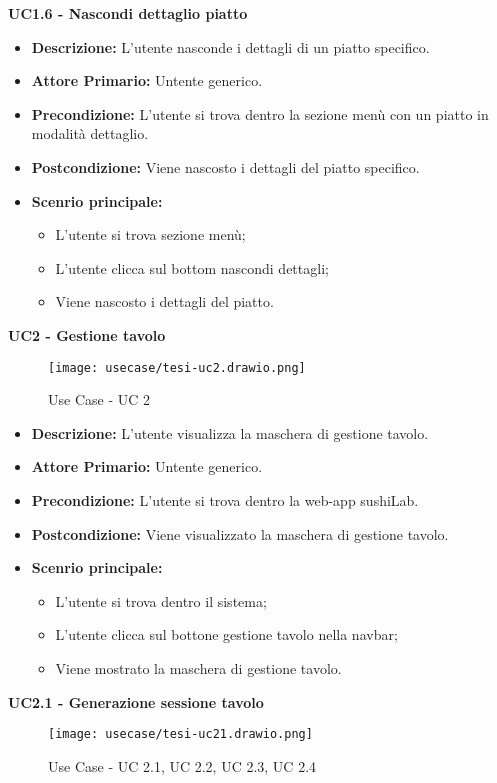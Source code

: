 \textbf{UC1.6 - Nascondi dettaglio piatto}
\begin{itemize}
    \item \textbf{Descrizione:} L'utente nasconde i dettagli di un piatto specifico.
    \item \textbf{Attore Primario:} Untente generico.
    \item \textbf{Precondizione:} L'utente si trova dentro la sezione menù con un piatto in modalità dettaglio.
    \item \textbf{Postcondizione:} Viene nascosto i dettagli del piatto specifico.
    \item \textbf{Scenrio principale:}  
    \begin{itemize}
        \item L'utente si trova sezione menù;
        \item L'utente clicca sul bottom nascondi dettagli;
        \item Viene nascosto i dettagli del piatto.
    \end{itemize}
\end{itemize}
\textbf{UC2 - Gestione tavolo}
\begin{figure}[H]
    \centering
    \texttt{[image: usecase/tesi-uc2.drawio.png]}
    \caption{Use Case - UC 2}
\end{figure}
\begin{itemize}
    \item \textbf{Descrizione:} L'utente visualizza la maschera di gestione tavolo.
    \item \textbf{Attore Primario:} Untente generico.
    \item \textbf{Precondizione:} L'utente si trova dentro la web-app sushiLab.
    \item \textbf{Postcondizione:} Viene visualizzato la maschera di gestione tavolo.
    \item \textbf{Scenrio principale:}
    \begin{itemize}
        \item L'utente si trova dentro il sistema;
        \item L'utente clicca sul bottone gestione tavolo nella navbar;
        \item Viene mostrato la maschera di gestione tavolo.
    \end{itemize}
\end{itemize}
\textbf{UC2.1 - Generazione sessione tavolo}
\begin{figure}[H]
    \centering
    \texttt{[image: usecase/tesi-uc21.drawio.png]}
    \caption{Use Case - UC 2.1, UC 2.2, UC 2.3, UC 2.4}
\end{figure}
